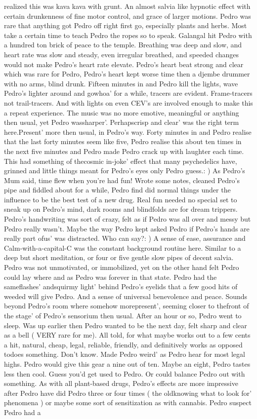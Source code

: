 \documentclass[12pt]{book}
\begin{document}
realized this was kava kava with grunt. An almost salvia like hypnotic effect with certain drunkenness of fine motor control, and grace of larger motions. Pedro was rare that anything got Pedro off right first go, especially plants and herbs. Most take a certain time to teach Pedro the ropes so to speak. Galangal hit Pedro with a hundred ton brick of peace to the temple. Breathing was deep and slow, and heart rate was slow and steady, even irregular breathed, and speeded changes would not make Pedro's heart rate elevate. Pedro's heart beat strong and clear which was rare for Pedro, Pedro's heart kept worse time then a djembe drummer with no arms, blind drunk. Fifteen minutes in and Pedro kill the lights, wave Pedro's lighter around and gowhoa' for a while, tracers are evident. Frame-tracers not trail-tracers. And with lights on even CEV's are involved enough to make this a repeat experience. The music was no more emotive, meaningful or anything then usual, yet Pedro wassharper'. Perhapscrisp and clear' was the right term here.Present' more then usual, in Pedro's way. Forty minutes in and Pedro realise that the last forty minutes seem like five, Pedro realise this about ten times in the next five minutes and Pedro made Pedro crack up with laughter each time. This had something of thecosmic in-joke' effect that many psychedelics have, grinned and little things meant for Pedro's eyes only Pedro guess.: ) As Pedro's Mum said, time flew when you're had fun! Wrote some notes, cleaned Pedro's pipe and fiddled about for a while, Pedro find did normal things under the influence to be the best test of a new drug. Real fun needed no special set to sneak up on Pedro's mind, dark rooms and blindfolds are for dream trippers. Pedro's handwriting was sort of crazy, felt as if Pedro was all over and messy but Pedro really wasn't. Maybe the way Pedro kept asked Pedro if Pedro's hands are really part ofus' was distracted. Who can say?: ) A sense of ease, assurance and Calm-with-a-capital-C was the constant background routine here. Similar to a deep but short meditation, or four or five gentle slow pipes of decent salvia. Pedro was not unmotivated, or immobilized, yet on the other hand felt Pedro could lay where and as Pedro was forever in that state. Pedro had the sameflashes' andsquirmy light' behind Pedro's eyelids that a few good hits of weeded will give Pedro. And a sense of universal benevolence and peace. Sounds beyond Pedro's room where somehow morepresent', seeming closer to thefront of the stage' of Pedro's sensorium then usual. After an hour or so, Pedro went to sleep. Was up earlier then Pedro wanted to be the next day, felt sharp and clear as a bell ( VERY rare for me). All told, for what maybe works out to a few cents a hit, natural, cheap, legal, reliable, friendly, and definitively works as opposed todoes something. Don't know. Made Pedro weird' as Pedro hear for most legal highs. Pedro would give this gear a nine out of ten. Maybe an eight, Pedro tastes less then cool. Guess you'd get used to Pedro. Or could balance Pedro out with something. As with all plant-based drugs, Pedro's effects are more impressive after Pedro have did Pedro three or four times ( the oldknowing what to look for' phenomena ) or maybe some sort of sensitization as with cannabis. Pedro suspect Pedro had a 
\end{document}
